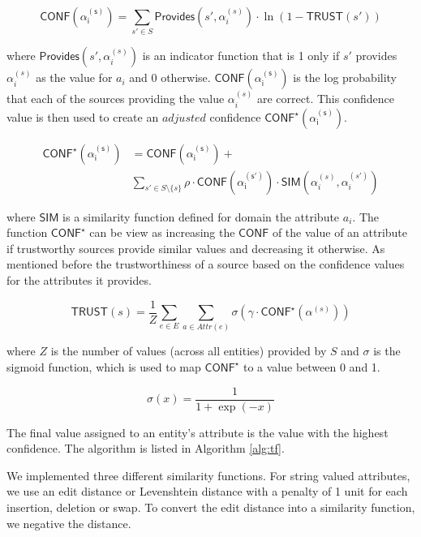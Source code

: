 \documentclass{acm_proc_article-sp}
\begin{document}
\begin{equation}
\mathsf{CONF(\alpha_i^{(s)})} = \sum_{s' \in S} \mathsf{Provides}(s',\alpha_i^{(s)}) \cdot \ln(1-\mathsf{TRUST}(s'))
\end{equation}

where $\mathsf{Provides}(s',\alpha_i^{(s)})$ is an indicator function that is 1 only if $s'$ provides $\alpha_i^{(s)}$ as the value for $a_i$ and 0 otherwise. $\mathsf{CONF(\alpha_i^{(s)})}$ is the log probability that each of the sources providing the value $\alpha_i^{(s)}$ are correct. This confidence value is then used to create an $adjusted$ confidence $\mathsf{CONF^\star(\alpha_i^{(s)})}$.

\begin{align}
\mathsf{CONF^\star(\alpha_i^{(s)})} &= \mathsf{CONF(\alpha_i^{(s)})} + \\ \nonumber
&  \sum_{s' \in S \setminus \{s\}} \rho \cdot \mathsf{CONF(\alpha_i^{(s')})}  \cdot \mathsf{SIM}(\alpha_i^{(s)},\alpha_i^{(s')})
\end{align}

where $\mathsf{SIM}$ is a similarity function defined  for domain the attribute $a_i$. The function $\mathsf{CONF}^\star$ can be view as increasing  the $\mathsf{CONF}$ of the value of an attribute if trustworthy sources provide similar values and decreasing it otherwise. As mentioned before the trustworthiness of a source based on the confidence values for the attributes it provides. 

\begin{equation}
\mathsf{TRUST}(s) = \frac{1}{Z} \sum_{e \in E}\sum_{a \in Attr(e)} \sigma(\gamma \cdot \mathsf{CONF}^\star(\alpha^{(s)}))
\end{equation}

where $Z$ is the number of values (across all entities) provided by $S$ and $\sigma$ is the sigmoid function, which is used to map $\mathsf{CONF}^\star$ to a value between 0 and 1.

\begin{equation}
\sigma(x) = \frac{1}{1 + \exp{(-x)}}
\end{equation}

The final value assigned to an entity's attribute is the value with the highest confidence. The algorithm is listed in Algorithm \ref{alg:tf}.

We implemented three different similarity functions. For string valued attributes, we use an edit distance or Levenshtein distance with a penalty of 1 unit for each insertion, deletion or swap. To convert the edit distance into a similarity function, we negative the distance. 
\end{document}
